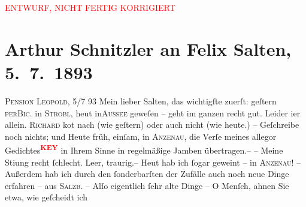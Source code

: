 
\begin{center}
            \textcolor{red}{ENTWURF, NICHT FERTIG KORRIGIERT}
                      \end{center}
            
         
         \newcommand{\erwaehntePersonen}{Personen: Richard Beer-Hofmann, Paul Horn, Josef Jarno, Felix Salten, Richard Specht, Ignaz Wild, Grethe Wreden}
         \newcommand{\erwaehnteOrte}{Orte: Anzenau, Bad Aussee, Bad Ischl, Hotel und Pension Rudolfshöhe (Leopold Petter), Salzburg, Strobl, Wien}
         \newcommand{\erwaehnteWerke}{Werke: Abschiedssouper, Das Märchen. Schauspiel in drei Aufzügen, Die Frage an das Schicksal}
               \section[Arthur Schnitzler an Felix Salten, 5. 7. 1893]{ Arthur Schnitzler an Felix Salten, 5. 7. 1893}\nopagebreak{}\rehead{ }\begin{ledgroupsized}[t]{13cm}\normalsize\beginnumbering \toendnotes[C]{\smallbreak\pagebreak[2]} 
\toendnotes[C]{\smallbreak}\pstart
           \raggedleft{}{\pb}\textsc{Pension Leopold}, 5/7 93\pend
           \pstart{}Mein lieber Salten,\pend\pstart
           das wichtigſte zuerſt: geſtern \textsc{per}\textsc{Bic.} in \textsc{Strobl}, heut in\textsc{Aussee} geweſen – geht im ganzen recht gut. Leider i{\geminationm}er allein. \textsc{Richard} ko{\geminationm}t nach (wie geſtern) oder auch nicht (wie heute.) – Geſchreibe noch nichts;
               und {\pb}Heute früh, einſam, in \textsc{Anzenau}, die Verſe meines allegor Gedichtes\textcolor{red}{\textsuperscript{\textbf{KEY}}} in Ihrem Sinne
               in regelmäßige Jamben übertragen.– – Meine Sti{\geminationm}ung recht ſchlecht. Leer, traurig.–
               Heut hab ich ſogar geweint – in \textsc{Anzenau}! – Außerdem hab ich durch den ſonderbarſten der Zufälle auch noch neue Dinge
               erfahren – {\pb}aus \textsc{Salzb.} – Alſo eigentlich ſehr alte Dinge – O Menſch, ahnen Sie etwa, wie geſcheidt ich

\end{ledgroupsized}
